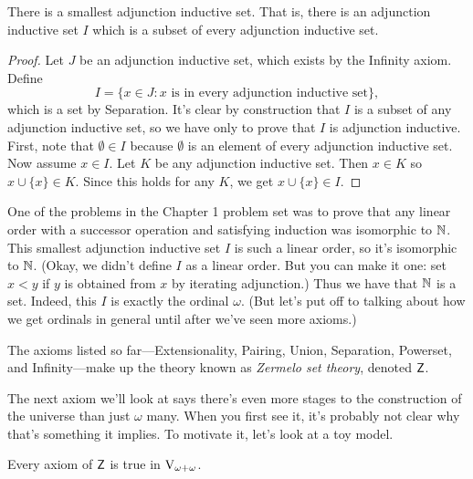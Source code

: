 \documentclass[10pt]{amsart}
\begin{document}
\begin{proposition}
There is a smallest adjunction inductive set. That is, there is an adjunction inductive set $I$ which is a subset of every adjunction inductive set.
\end{proposition}

\begin{proof}
Let $J$ be an adjunction inductive set, which exists by the Infinity axiom. Define
\[
I = \{ x \in J : x \text{ is in every adjunction inductive set}\},
\]
which is a set by Separation. It's clear by construction that $I$ is a subset of any adjunction inductive set, so we have only to prove that $I$ is adjunction inductive. First, note that $\emptyset \in I$ because $\emptyset$ is an element of every adjunction inductive set. Now assume $x \in I$. Let $K$ be any adjunction inductive set. Then $x \in K$ so $x \cup \{x\} \in K$. Since this holds for any $K$, we get $x \cup \{x\} \in I$.
\end{proof}

One of the problems in the Chapter 1 problem set was to prove that any linear order with a successor operation and satisfying induction was isomorphic to $\mathbb{N}$. This smallest adjunction inductive set $I$ is such a linear order, so it's isomorphic to $\mathbb{N}$. (Okay, we didn't define $I$ as a linear order. But you can make it one: set $x < y$ if $y$ is obtained from $x$ by iterating adjunction.) Thus we have that $\mathbb{N}$ is a set. Indeed, this $I$ is exactly the ordinal $\omega$. (But let's put off to talking about how we get ordinals in general until after we've seen more axioms.)

\begin{definition}
The axioms listed so far---Extensionality, Pairing, Union, Separation, Powerset, and Infinity---make up the theory known as \emph{Zermelo set theory}, denoted $\mathsf{Z}$.
\end{definition}

The next axiom we'll look at says there's even more stages to the construction of the universe than just $\omega$ many. When you first see it, it's probably not clear why that's something it implies. To motivate it, let's look at a toy model.

\begin{theorem}
Every axiom of $\mathsf{Z}$ is true in $\mathrm{V}_{\omega+\omega}$. 
\end{theorem}
\end{document}
